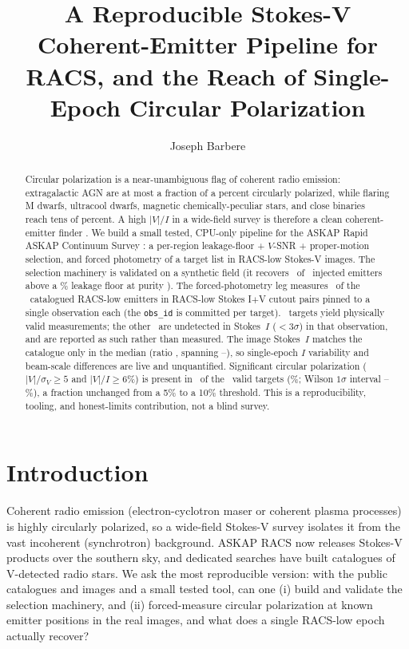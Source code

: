 \documentclass[twocolumn]{aastex631}
\newcommand{\code}[1]{\texttt{#1}}
\begin{document}
\title{A Reproducible Stokes-V Coherent-Emitter Pipeline for RACS, and the Reach of
Single-Epoch Circular Polarization}

\author[0009-0008-3289-4447]{Joseph Barbere}

\begin{abstract}
Circular polarization is a near-unambiguous flag of coherent radio emission: extragalactic AGN
are at most a fraction of a percent circularly polarized, while flaring M dwarfs, ultracool dwarfs,
magnetic chemically-peculiar stars, and close binaries reach tens of percent. A high $|V|/I$ in a
wide-field survey is therefore a clean coherent-emitter finder \citep{pritchard2021}. We build a small
tested, CPU-only pipeline for the ASKAP Rapid ASKAP Continuum Survey \citep{mcconnell2020}: a
per-region leakage-floor + $V$-SNR + proper-motion selection, and forced photometry of a target
list in RACS-low Stokes-V images. The selection machinery is validated on a synthetic field (it
recovers \svNrecovered\ of \svNinjected\ injected emitters above a \svLeakFloorPct\% leakage floor at
purity \svPurity). The forced-photometry leg measures \svNmeasured\ of the \svNparent\ catalogued RACS-low
emitters \citep{driessen2024} in RACS-low \citep{hale2021} Stokes I$+$V cutout pairs pinned to
a single observation each (the \code{obs\_id} is committed per target). \svNvalid\ targets
yield physically valid measurements; the other \svNinvalid\ are undetected in Stokes~$I$
($<3\sigma$) in that observation, and are reported as such rather than measured. The image
Stokes~$I$ matches the catalogue only in the median (ratio \svIrec, spanning
\svIrecMin--\svIrecMax), so single-epoch $I$ variability and beam-scale differences are live
and unquantified. Significant circular polarization ($|V|/\sigma_V\ge5$ and $|V|/I\ge6\%$) is
present in \svNVcirc\ of the \svNvalid\ valid targets (\svFracVcircPct\%; Wilson $1\sigma$
interval \svFracVcircLo--\svFracVcircHi\%), a fraction unchanged from a 5\% to a 10\%
threshold. This is a reproducibility, tooling, and honest-limits contribution, not a blind
survey.
\end{abstract}


\section{Introduction}
Coherent radio emission (electron-cyclotron maser or coherent plasma processes) is highly
circularly polarized, so a wide-field Stokes-V survey isolates it from the vast incoherent
(synchrotron) background. ASKAP RACS \citep{mcconnell2020} now releases Stokes-V products over the
southern sky, and dedicated searches \citep{pritchard2021,driessen2024} have built catalogues of
V-detected radio stars. We ask the most reproducible version: with the public catalogues and images
and a small tested tool, can one (i) build and validate the selection machinery, and (ii) forced-measure
circular polarization at known emitter positions in the real images, and what does a single RACS-low
epoch actually recover?
\end{document}
